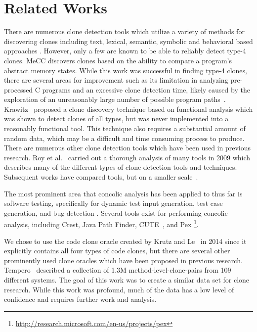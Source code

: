 \documentclass{sig-alternate}
\newcommand{\todo}[1]{\textcolor{cyan}{\textbf{[#1]}}}
\begin{document}


\section{Related Works}
\label{sec: relatedworks}

There are numerous clone detection tools which utilize a variety of methods for discovering clones including text, lexical, semantic, symbolic and behavioral based approaches \cite{Roy:2009:CEC:1530898.1531101,Kim:2011:MMC:1985793.1985835}. However, only a few are known to be able to reliably detect type-4 clones. MeCC discovers clones based on the ability to compare a program's abstract memory states. While this work was successful in finding type-4 clones, there are several areas for improvement such as its limitation in analyzing pre-processed C programs and an excessive clone detection time, likely caused by the exploration of an unreasonably large number of possible program paths~\cite{Kim:2011:MMC:1985793.1985835}. Krawitz~\cite{Kraw2012} proposed a clone discovery technique based on functional analysis which was shown to detect clones of all types, but was never implemented into a reasonably functional tool. This technique also requires a substantial amount of random data, which may be a difficult and time consuming process to produce. There are numerous other clone detection tools which have been used in previous research. Roy et al.~\cite{Roy:2009:CEC:1530898.1531101} carried out a thorough analysis of many tools in 2009 which describes many of the different types of clone detection tools and techniques. Subsequent works have compared tools, but on a smaller scale~\cite{arcelli2013software,svajlenko2013scaling}.

The most prominent area that concolic analysis has been applied to thus far is software testing, specifically for dynamic test input generation, test case generation, and bug detection \cite{Wassermann:2008:DTI:1390630.1390661, Sen:2005:CCU:1081706.1081750}. Several tools exist for performing concolic analysis, including Crest, Java Path Finder, CUTE~\cite{Sen:2005:CCU:1081706.1081750}, and Pex \footnote{\url{http://research.microsoft.com/en-us/projects/pex}}.

We chose to use the code clone oracle created by Krutz and Le~\cite{Krutz:2014:CCO:2597073.2597127} in 2014 since it explicitly contains all four types of code clones, but there are several other prominently used clone oracles which have been proposed in previous research. Tempero~\cite{IWSC13p53} described a collection of 1.3M method-level-clone-pairs from 109 different systems. The goal of this work was to create a similar data set for clone research. While this work was profound, much of the data has a low level of confidence and requires further work and analysis.
\end{document}
